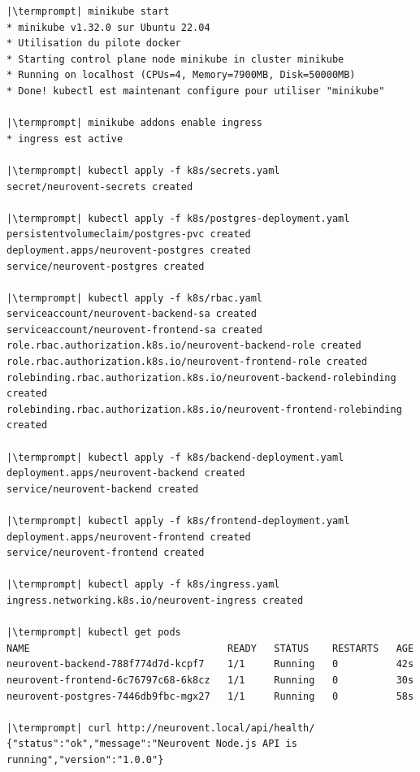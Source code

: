 \documentclass[12pt,a4paper]{article}
\makeatletter
\newcommand{\termprompt}{%
  \textcolor{termgreen}{\textbf{azouaou@Az-zou}}%
  \textcolor{termfg}{:}%
  \textcolor{termcyan}{\textasciitilde/NeuroVent}%
  \textcolor{termfg}{\$}}
\makeatother
\begin{document}
\begin{lstlisting}[style=terminal, caption={Déploiement complet depuis zéro}]
|\termprompt| minikube start
* minikube v1.32.0 sur Ubuntu 22.04
* Utilisation du pilote docker
* Starting control plane node minikube in cluster minikube
* Running on localhost (CPUs=4, Memory=7900MB, Disk=50000MB)
* Done! kubectl est maintenant configure pour utiliser "minikube"

|\termprompt| minikube addons enable ingress
* ingress est active

|\termprompt| kubectl apply -f k8s/secrets.yaml
secret/neurovent-secrets created

|\termprompt| kubectl apply -f k8s/postgres-deployment.yaml
persistentvolumeclaim/postgres-pvc created
deployment.apps/neurovent-postgres created
service/neurovent-postgres created

|\termprompt| kubectl apply -f k8s/rbac.yaml
serviceaccount/neurovent-backend-sa created
serviceaccount/neurovent-frontend-sa created
role.rbac.authorization.k8s.io/neurovent-backend-role created
role.rbac.authorization.k8s.io/neurovent-frontend-role created
rolebinding.rbac.authorization.k8s.io/neurovent-backend-rolebinding created
rolebinding.rbac.authorization.k8s.io/neurovent-frontend-rolebinding created

|\termprompt| kubectl apply -f k8s/backend-deployment.yaml
deployment.apps/neurovent-backend created
service/neurovent-backend created

|\termprompt| kubectl apply -f k8s/frontend-deployment.yaml
deployment.apps/neurovent-frontend created
service/neurovent-frontend created

|\termprompt| kubectl apply -f k8s/ingress.yaml
ingress.networking.k8s.io/neurovent-ingress created

|\termprompt| kubectl get pods
NAME                                  READY   STATUS    RESTARTS   AGE
neurovent-backend-788f774d7d-kcpf7    1/1     Running   0          42s
neurovent-frontend-6c76797c68-6k8cz   1/1     Running   0          30s
neurovent-postgres-7446db9fbc-mgx27   1/1     Running   0          58s

|\termprompt| curl http://neurovent.local/api/health/
{"status":"ok","message":"Neurovent Node.js API is running","version":"1.0.0"}
\end{lstlisting}
\end{document}
